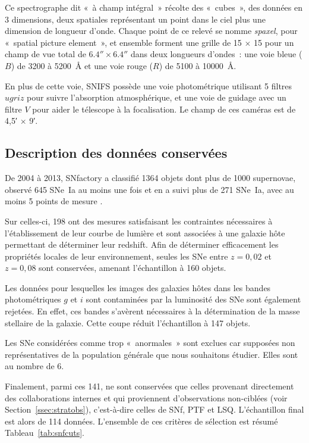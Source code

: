 \documentclass[../main/main.tex]{subfiles}
\begin{document}
Ce spectrographe dit «~à champ intégral~» récolte des «~cubes~», des données en
3 dimensions, deux spatiales représentant un point dans le ciel plus une
dimension de longueur d'onde. Chaque point de ce relevé se nomme
\textit{spaxel}, pour «~spatial picture element~», et ensemble forment une
grille de 15 $\times$ 15 pour un champ de vue total de
$\ang{;;6,4}\times\ang{;;6,4}$ dans deux longueurs d'ondes~: une voie bleue
($B$) de 3200 à \SI{5200}{\angstrom} et une voie rouge ($R$) de 5100 à
\SI{10000}{\angstrom}.

En plus de cette voie, SNIFS possède une voie photométrique utilisant 5 filtres
$ugriz$ pour suivre l'absorption atmosphérique, et une voie de guidage avec un
filtre $V$ pour aider le télescope à la focalisation. Le champ de ces caméras
est de \ang{;4,5;} $\times$ \ang{;9;}.

\subsection{Description des données conservées}\label{ssec:snfdata}

De 2004 à 2013, SNfactory a classifié 1364 objets dont plus de 1000 supernovae,
observé 645 SNe~Ia au moins une fois et en a suivi plus de 271 SNe~Ia, avec au
moins 5 points de mesure \citep{copin2013}.

Sur celles-ci, 198 ont des mesures satisfaisant les contraintes nécessaires à
l'établissement de leur courbe de lumière et sont associées à une galaxie hôte
permettant de déterminer leur redshift. Afin de déterminer efficacement les
propriétés locales de leur environnement, seules les SNe entre $z = 0,02$ et $z
= 0,08$ sont conservées, amenant l'échantillon à 160 objets.

Les données pour lesquelles les images des galaxies hôtes dans les bandes
photométriques $g$ et $i$ sont contaminées par la luminosité des SNe sont
également rejetées. En effet, ces bandes s'avèrent nécessaires à la
détermination de la masse stellaire de la galaxie. Cette coupe réduit
l'échantillon à 147 objets.

Les SNe considérées comme trop «~anormales~» sont exclues car supposées non
représentatives de la population générale que nous souhaitons étudier. Elles
sont au nombre de 6.

Finalement, parmi ces 141, ne sont conservées que celles provenant directement
des collaborations internes et qui proviennent d'observations non-ciblées (voir
Section~\ref{ssec:stratobs}), c'est-à-dire celles de SNf, PTF et LSQ.
L'échantillon final est alors de 114 données. L'ensemble de ces critères de
sélection est résumé Tableau~\ref{tab:snfcuts}.
\end{document}
